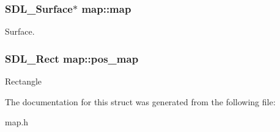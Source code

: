 \subsubsection[{\texorpdfstring{map}{map}}]{\setlength{\rightskip}{0pt plus 5cm}S\+D\+L\+\_\+\+Surface$\ast$ map\+::map}\hypertarget{structmap_a32daf60eeab6910e405dc049350b1e9c}{}\label{structmap_a32daf60eeab6910e405dc049350b1e9c}
Surface. 
\subsubsection[{\texorpdfstring{pos\+\_\+map}{pos_map}}]{\setlength{\rightskip}{0pt plus 5cm}S\+D\+L\+\_\+\+Rect map\+::pos\+\_\+map}\hypertarget{structmap_a892e2b0bcb168e8a85bd000b1bda0611}{}\label{structmap_a892e2b0bcb168e8a85bd000b1bda0611}
Rectangle 

The documentation for this struct was generated from the following file\+:\begin{DoxyCompactItemize}
\item 
map.\+h\end{DoxyCompactItemize}
